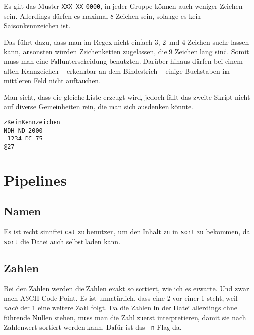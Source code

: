 \documentclass[12pt]{report}
\begin{document}
Es gilt das Muster \texttt{XXX XX 0000}, in jeder Gruppe können auch weniger Zeichen sein. Allerdings dürfen es maximal 8 Zeichen sein, solange es kein Saisonkennzeichen ist.

Das führt dazu, dass man im Regex nicht einfach 3, 2 und 4 Zeichen suche lassen kann, ansonsten würden Zeichenketten zugelassen, die 9 Zeichen lang sind. Somit muss man eine Fallunterscheidung benutzten. Darüber hinaus dürfen bei einem alten Kennzeichen -- erkennbar an dem Bindestrich -- einige Buchstaben im mittleren Feld nicht auftauchen.





Man sieht, dass die gleiche Liste erzeugt wird, jedoch fällt das zweite Skript nicht auf diverse Gemeinheiten rein, die man sich ausdenken könnte.

\begin{lstlisting}[caption=Gemeinheiten für Listing \ref{listing:auto-einfach}]
zKeinKennzeichen
NDH ND 2000
 1234 DC 75
@27
\end{lstlisting}

\section{Pipelines}
\subsection{Namen}


Es ist recht sinnfrei \texttt{cat} zu benutzen, um den Inhalt zu in \texttt{sort} zu bekommen, da \texttt{sort} die Datei auch selbst laden kann.




\subsection{Zahlen}



Bei den Zahlen werden die Zahlen exakt so sortiert, wie ich es erwarte. Und zwar nach ASCII Code Point. Es ist unnatürlich, dass eine 2 vor einer 1 steht, weil \textit{nach} der 1 eine weitere Zahl folgt. Da die Zahlen in der Datei allerdings ohne führende Nullen stehen, muss man die Zahl zuerst interpretieren, damit sie nach Zahlenwert sortiert werden kann. Dafür ist das \texttt{-n} Flag da.
\end{document}

